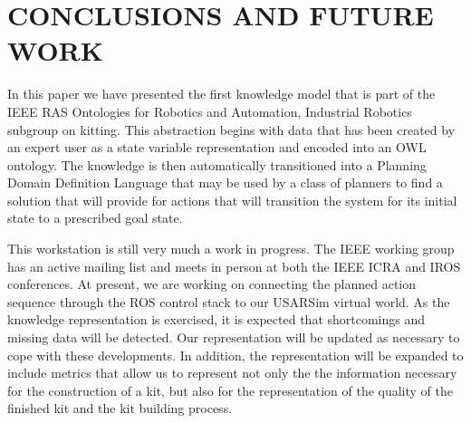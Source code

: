 \section{CONCLUSIONS AND FUTURE WORK}
\label{sect:Conclusions}
In this paper we have presented the first knowledge model that is part of the IEEE RAS Ontologies for Robotics and Automation, Industrial Robotics subgroup on kitting.
This abstraction begins with data that has been created by an expert user as a state variable representation and encoded into an OWL ontology. The knowledge
is then automatically transitioned into a Planning Domain Definition Language that may be used by a class of planners to find a solution that will provide for actions that will
transition the system for its initial state to a prescribed goal state.

This workstation is still very much a work in progress. The IEEE working group has an active mailing list and meets in person at both the IEEE ICRA and IROS conferences.
At present, we are working on connecting the planned action sequence through the ROS control stack to our USARSim virtual world. As the knowledge representation is
exercised, it is expected that shortcomings and missing data will be detected. Our representation will be updated as necessary to cope with these developments. In addition,
the representation will be expanded to include metrics that allow us to represent not only the the information necessary for the construction of a kit, but also for the representation
of the quality of the finished kit and the kit building process.




